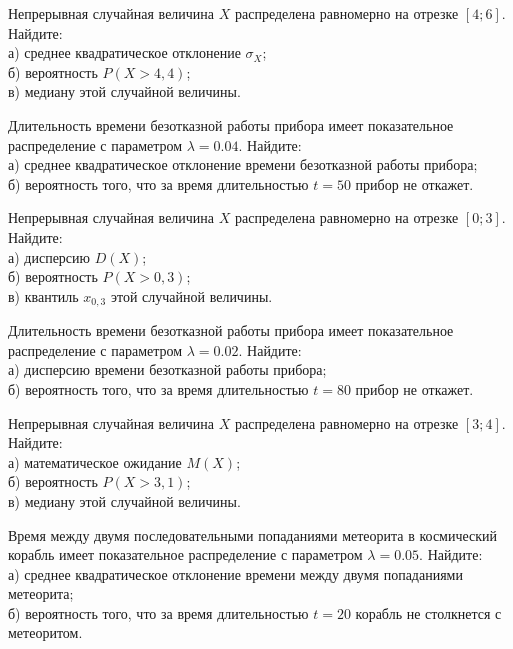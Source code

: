 \vfill

\newpage\setcounter{zad}{0}

\z Непрерывная случайная величина $X$ распределена равномерно на отрезке $[4; 6]$. Найдите: \\ \quad а) среднее квадратическое отклонение $\sigma_X$; \\ \quad б) вероятность $P(X>4{,}4)$; \\ \quad в) медиану этой случайной величины.


\vfill

\z Длительность времени безотказной работы прибора имеет показательное распределение с параметром $\lambda = 0.04$. Найдите: \\ \quad а) среднее квадратическое отклонение времени безотказной работы прибора; \\ \quad б) вероятность того, что за время длительностью $t = 50$ прибор не откажет.
 

\vfill

\newpage\setcounter{zad}{0}

\z Непрерывная случайная величина $X$ распределена равномерно на отрезке $[0; 3]$. Найдите: \\ \quad а) дисперсию $D(X)$; \\ \quad б) вероятность $P(X>0{,}3)$; \\ \quad в) квантиль $x_{0{,}3}$ этой случайной величины.


\vfill

\z Длительность времени безотказной работы прибора имеет показательное распределение с параметром $\lambda = 0.02$. Найдите: \\ \quad а) дисперсию времени безотказной работы прибора; \\ \quad б) вероятность того, что за время длительностью $t = 80$ прибор не откажет.
 

\vfill

\newpage\setcounter{zad}{0}

\z Непрерывная случайная величина $X$ распределена равномерно на отрезке $[3; 4]$. Найдите: \\ \quad а) математическое ожидание $M(X)$; \\ \quad б) вероятность $P(X>3{,}1)$; \\ \quad в) медиану этой случайной величины.


\vfill

\z Время между двумя последовательными попаданиями метеорита в космический корабль имеет показательное распределение с параметром $\lambda = 0.05$. Найдите: \\ \quad а) среднее квадратическое отклонение времени между двумя попаданиями метеорита; \\ \quad б) вероятность того, что за время длительностью $t = 20$ корабль не столкнется с метеоритом.
 

